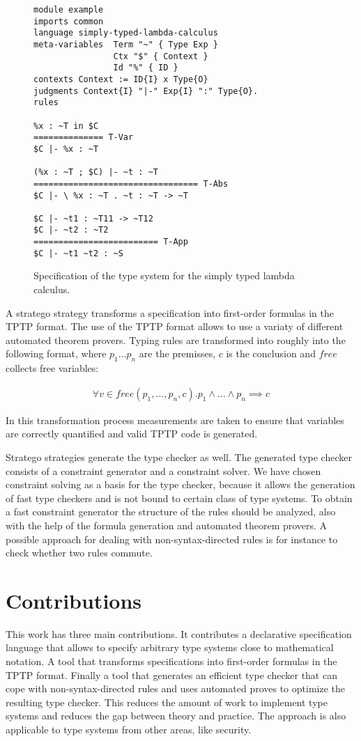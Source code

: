 \documentclass{acm_proc_article-sp}
\begin{document}
\begin{figure}
\begin{verbatim}
module example
imports common
language simply-typed-lambda-calculus
meta-variables 	Term "~" { Type Exp }
                Ctx "$" { Context }
                Id "%" { ID }
contexts Context := ID{I} x Type{O}
judgments Context{I} "|-" Exp{I} ":" Type{O}.
rules

%x : ~T in $C
============== T-Var
$C |- %x : ~T

(%x : ~T ; $C) |- ~t : ~T
================================= T-Abs
$C |- \ %x : ~T . ~t : ~T -> ~T

$C |- ~t1 : ~T11 -> ~T12
$C |- ~t2 : ~T2
========================= T-App
$C |- ~t1 ~t2 : ~S
\end{verbatim}
\caption{Specification of the type system for the simply typed lambda
  calculus.}
\label{fig:example-specification}
\end{figure}

A stratego strategy transforms a specification into first-order
formulas in the TPTP\cite{Sutcliffe04tstpdata-exchange} format. The
use of the TPTP format allows to use a variaty of different automated
theorem provers. Typing rules are transformed into roughly into the
following format, where $p_1 \dots p_n$ are the premisses, $c$ is the
conclusion and $free$ collects free variables:

\begin{align}
  \forall v \in free(p_1, \dots, p_n, c) . p_1 \land \dots \land p_n \implies  c 
\end{align}

In this transformation process measurements are taken to ensure that
variables are correctly quantified and valid TPTP code is generated.

Stratego strategies generate the type checker as well. The generated
type checker consists of a constraint generator and a constraint
solver. We have chosen constraint solving as a basis for the type
checker, because it allows the generation of fast type checkers and is
not bound to certain class of type systems. To obtain a fast
constraint generator the structure of the rules should be analyzed,
also with the help of the formula generation and automated theorem
provers. A possible approach for dealing with non-syntax-directed
rules is for instance to check whether two rules commute.
\section{Contributions}
This work has three main contributions. It contributes a declarative
specification language that allows to specify arbitrary type systems
close to mathematical notation. A tool that transforms specifications
into first-order formulas in the TPTP format. Finally a tool that
generates an efficient type checker that can cope with
non-syntax-directed rules and uses automated proves to optimize the
resulting type checker. This reduces the amount of work to implement
type systems and reduces the gap between theory and practice. The
approach is also applicable to type systems from other areas, like
security.
\end{document}
